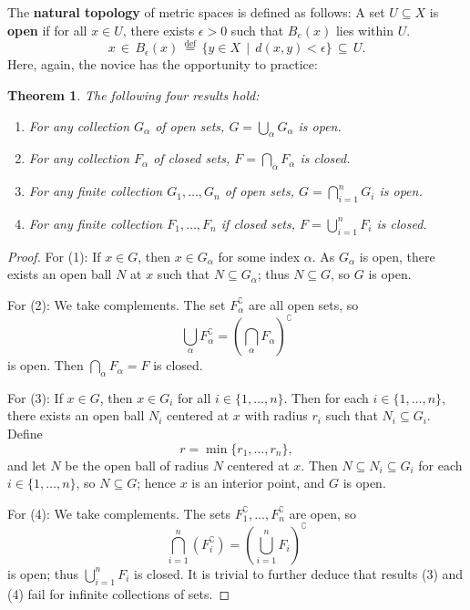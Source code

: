 \documentclass[11pt]{article}
\newtheorem{theorem}{Theorem}
\begin{document}
The \textbf{natural topology} of metric spaces is defined as follows: A set $U \subseteq X$ is \textbf{open} if for all $x \in U$, there exists $\epsilon > 0$ such that $B_{e}(x)$ lies within $U$.
\[
  x \, \in \,  B_{\epsilon}(x) \, \stackrel{\text{def}}{=} \, \{ y \in X \, \mid \, d(x, y) < \epsilon \} \, \subseteq \, U.
\]
 Here, again, the novice has the opportunity to practice:

\newpage

\begin{theorem}
	The following four results hold:
	\begin{enumerate}
		\item For any collection $G_{\alpha}$ of open sets, $G = \bigcup_{\alpha} G_{\alpha}$ is open.
		\item For any collection $F_{\alpha}$ of closed sets, $F = \bigcap_{\alpha} F_{\alpha}$ is closed.
		\item For any finite collection $G_{1}, \ldots, G_{n}$ of open sets, $G = \bigcap_{i = 1}^{n} G_{i}$ is open.
		\item For any finite collection $F_{1}, \ldots, F_{n}$ if closed sets, $F = \bigcup_{i = 1}^{n} F_{i}$ is closed.
	\end{enumerate}
\end{theorem}
\begin{adjustwidth}{1cm}{}
	\begin{proof}
		For (1): If $x \in G$, then $x \in G_{\alpha}$ for some index $\alpha$. As $G_{\alpha}$ is open, there exists an open ball $N$ at $x$ such that $N \subseteq G_{\alpha}$; thus $N \subseteq G$, so $G$ is open.

		For (2): We take complements. The set $F_{\alpha}^{\complement}$ are all open sets, so
		\[
			\bigcup\limits_{\alpha} F_{\alpha}^{\complement} = \left( \bigcap\limits_{\alpha} F_{\alpha} \right)^{\complement}
		\]
		is open. Then $\bigcap_{\alpha} F_{\alpha} = F$ is closed.

		For (3): If $x \in G$, then $x \in G_{i}$ for all $i \in \{ 1, \ldots, n \}$. Then for each $i \in \{ 1, \ldots, n \}$, there exists an open ball $N_{i}$ centered at $x$ with radius $r_{i}$ such that $N_{i} \subseteq G_{i}$. Define
		\[
			r = \min \{ r_{1}, \ldots, r_{n} \},
		\]
		and let $N$ be the open ball of radius $N$ centered at $x$. Then $N \subseteq N_{i} \subseteq G_{i}$ for each $i \in \{ 1, \ldots, n \}$, so $N \subseteq G$; hence $x$ is an interior point, and $G$ is open.

		For (4): We take complements. The sets $F_{1}^{\complement}, \ldots, F_{n}^{\complement}$ are open, so
		\[
			\bigcap\limits_{i = 1}^{n} (F_{i}^{\complement}) = \left( \bigcup\limits_{i = 1}^{n} F_{i} \right)^{\complement}
		\]
		is open; thus $\bigcup_{i = 1}^{n} F_{i}$ is closed. It is trivial to further deduce that results (3) and (4) fail for infinite collections of sets.
	\end{proof}
\end{adjustwidth}
\end{document}
